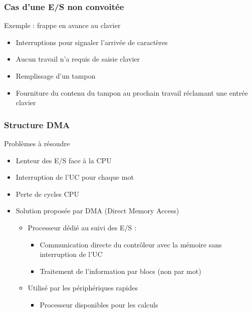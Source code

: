 \begin{frame}
\frametitle{Cas d’une E/S non convoitée}
\begin{exampleblock}{Exemple : frappe en avance au clavier}
\begin{itemize}
\item Interruptions pour signaler l’arrivée de caractères
\item Aucun travail n’a requis de saisie clavier
\item Remplissage d’un tampon
\item Fourniture du contenu du tampon au prochain travail réclamant une entrée clavier
\end{itemize}
\end{exampleblock}
\end{frame}


\begin{frame}
\frametitle{Structure DMA}
\begin{block}{Problèmes à résoudre}
\begin{itemize}
\item Lenteur des E/S face à la CPU
\item Interruption de l’UC pour chaque mot
\end{itemize}
\end{block}
\begin{itemize}
\item Perte de cycles CPU
\item Solution proposée par DMA (Direct Memory Access)
\begin{itemize}
\item Processeur dédié au suivi des E/S :
\begin{itemize}
\item Communication directe du contrôleur avec la mémoire sans interruption de l’UC
\item Traitement de l’information par blocs (non par mot)
\end{itemize}
\item Utilisé par les périphériques rapides
\begin{itemize}
\item Processeur disponibles pour les calculs
\end{itemize}
\end{itemize}
\end{itemize}
\end{frame}


